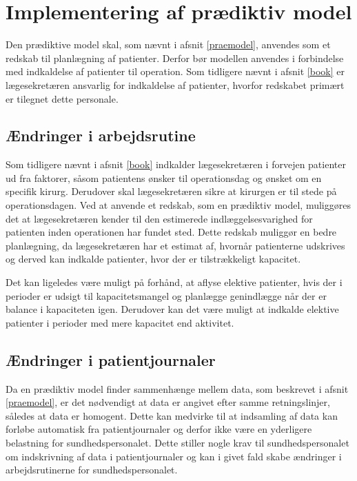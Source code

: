 \section{Implementering af prædiktiv model}
Den prædiktive model skal, som nævnt i afsnit \ref{praemodel}, anvendes som et redskab til planlægning af patienter. Derfor bør modellen anvendes i forbindelse med indkaldelse af patienter til operation. Som tidligere nævnt i afsnit \ref{book} er lægesekretæren ansvarlig for indkaldelse af patienter, hvorfor redskabet primært er tilegnet dette personale. 


\subsection{Ændringer i arbejdsrutine}\label{arbjedsrut}
Som tidligere nævnt i afsnit \ref{book} indkalder lægesekretæren i forvejen patienter ud fra faktorer, såsom patientens ønsker til operationsdag og ønsket om en specifik kirurg. Derudover skal lægesekretæren sikre at kirurgen er til stede på operationsdagen. Ved at anvende et redskab, som en prædiktiv model, muliggøres det at lægesekretæren kender til den estimerede indlæggelsesvarighed for patienten inden operationen har fundet sted. 
Dette redskab muliggør en bedre planlægning, da lægesekretæren har et estimat af, hvornår patienterne udskrives og derved kan indkalde patienter, hvor der er tilstrækkeligt kapacitet. 


Det kan ligeledes være muligt på forhånd, at aflyse elektive patienter, hvis der i perioder er udsigt til kapacitetsmangel og planlægge genindlægge når der er balance i kapaciteten igen. Derudover kan det være muligt at indkalde elektive patienter i perioder med mere kapacitet end aktivitet. 


\subsection{Ændringer i patientjournaler}
Da en prædiktiv model finder sammenhænge mellem data, som beskrevet i afsnit \ref{praemodel}, er det nødvendigt at data er angivet efter samme retningslinjer, således at data er homogent\cite{Kuhn2013}. Dette kan medvirke til at indsamling af data kan forløbe automatisk fra patientjournaler og derfor ikke være en yderligere belastning for sundhedspersonalet. Dette stiller nogle krav til sundhedspersonalet om indskrivning af data i patientjournaler og kan i givet fald skabe ændringer i arbejdsrutinerne for sundhedspersonalet.   


